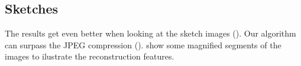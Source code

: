 



\newpage
\subsection{Sketches}
The results get even better when looking at the sketch images
(). Our algorithm can surpass the JPEG compression
().  show some magnified
segments of the images to ilustrate the reconstruction features.

